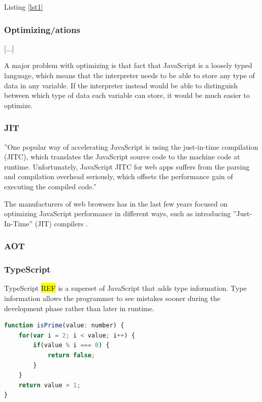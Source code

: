 Listing \ref{lst1}

\subsubsection*{Optimizing/ations}

[...]

A major problem with optimizing is that fact that JavaScript is a loosely typed language, which means that the interpreter needs to be able to store any type of data in any variable. If the interpreter instead would be able to distinguish between which type of data each variable can store, it would be much easier to optimize.

\subsubsection*{JIT}

''One popular way of accelerating JavaScript is using the just-in-time compilation (JITC), which translates the JavaScript source code to the machine code at runtime. Unfortunately, JavaScript JITC for web apps suffers from the parsing and compilation overhead seriously, which offsets the performance gain of executing the compiled code.'' \parencite{ParkJungMoon2015}

The manufacturers of web browsers has in the last few years focused on optimizing JavaScript performance in different ways, such as introducing ''Just-In-Time'' (JIT) compilers \parencite{HerreraChenLavoieHendren2018}.

\subsubsection*{AOT}



\subsubsection*{TypeScript}

TypeScript \hl{REF} is a superset of JavaScript that adds type information. Type information allows the programmer to see mistakes sooner during the development phase rather than later in runtime.

\begin{lstlisting}[label=listing:typescript,language=JavaScript,numbers=none,caption=prime.ts,frame=none]
function isPrime(value: number) {
    for(var i = 2; i < value; i++) {
        if(value % i === 0) {
            return false;
        }
    }
    return value > 1;
}
\end{lstlisting}

